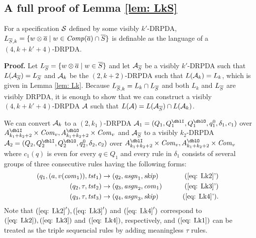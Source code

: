 \subsection{A full proof of Lemma \ref{lem: LkS}}
\setcounter{lemma}{\ref{lem: LkS}}
\addtocounter{lemma}{-1}
\begin{lemma}
For a specification ${\cal S}$ defined by some visibly $k'$-DRPDA,
$L_{{\overline{S}}, k} = \{w\otimes{\overline{a}} \mid w\in{\mathit{Comp}}({\overline{a}})\cap {\overline{S}}\}$
is definable as the language of a $(4,k+k'+4)$-DRPDA.
\end{lemma}
{\bf Proof.}\quad
Let $L_{{\overline{S}}} = \{w\otimes{\overline{a}}\mid w\in{\overline{S}}\}$ and let
${\cal A}_{{\overline{S}}}$ be a visibly $k'$-DRPDA such that $L({\cal A}_{{\overline{S}}})= L_{{\overline{S}}}$ and ${\cal A}_k$ be the $(2,k+2)$-DRPDA
such that $L({\cal A}_k)=L_k$, which is given in Lemma \ref{lem: Lk}.
Because $L_{{\overline{S}}, k} = L_k \cap L_{{\overline{S}}}$ and both $L_k$ and $L_{{\overline{S}}}$ are
visibly DRPDA, it is enough to show that we can construct a visibly $(4,k+k'+4)$-DRPDA ${\cal A}$ such that $L({\cal A})=L({\cal A}_{{\overline{S}}})\cap L({\cal A}_k)$.

We can convert ${\cal A}_k$ to a $(2,k_1)$-DRPDA $\calA_1=(Q_1, Q^\dblI_1, Q^\dblO_1, q^0_1, \delta_1, c_1)$
over $A^\dblI_{k_1+k_2+2}\times\Com_v,A^\dblO_{k_1+k_2+2}\times\Com_v$
and ${\cal A}_{{\overline{S}}}$ to a visibly $k_2$-DRPDA $\calA_2=(Q_2, Q^\dblI_2, Q^\dblO_2, q^0_2, \delta_2, c_2)$
over $A^\dblI_{k_1+k_2+2}\times\Com_v,A^\dblO_{k_1+k_2+2}\times\Com_v$ where
$c_1(q)$ is even for every $q\in Q_1$ and
every rule in $\delta_1$
consists of several groups of three consecutive rules having the following forms:
\begin{align}
(q_1, (a,v(\com_1)), \tst_1) &\to (q_2,\asgn_1, \skip)& \tag{\ref{eq: Lk2}'}\\
(q_2, \tau, \tst_2) &\to (q_3,\asgn_2, \com_1)& \tag{\ref{eq: Lk3}'}\\
(q_3, \tau, \tst_3) &\to (q_4,\asgn_3, \skip)& \tag{\ref{eq: Lk4}'}.
\end{align}
Note that $(\ref{eq: Lk2}'), (\ref{eq: Lk3}')$ and $(\ref{eq: Lk4}')$ correspond to $(\ref{eq: Lk2}), (\ref{eq: Lk3})$ and $(\ref{eq: Lk4})$, respectively, and $(\ref{eq: Lk1})$ can be treated as the triple sequencial rules by adding meaningless $\tau$ rules.

